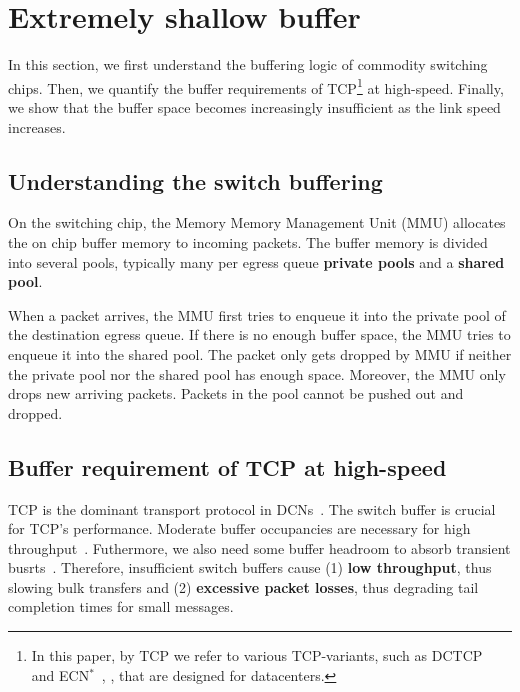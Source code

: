 \section{Extremely shallow buffer}\label{sec:background}
In this section, we first understand the buffering logic of commodity switching chips. Then, we quantify the buffer requirements of TCP\footnote{In this paper, by TCP we refer to various TCP-variants, such as DCTCP~\cite{dctcp} and ECN$^{*}$~\cite{tuning}, \etc, that are designed for datacenters.} at high-speed. Finally, we show that the buffer space becomes increasingly insufficient as the link speed increases.

\subsection{Understanding the switch buffering}
On the switching chip, the Memory Memory Management Unit (MMU) allocates the on chip buffer memory to incoming packets. The buffer memory is divided into several pools, typically many per egress queue \textbf{private pools} and a \textbf{shared pool}.


When a packet arrives, the MMU first tries to enqueue it into the private pool of the destination egress queue. If there is no enough buffer space, the MMU tries to enqueue it into the shared pool. The packet only gets dropped by MMU if neither the private pool nor the shared pool has enough space. Moreover, the MMU only drops new arriving packets. Packets in the pool cannot be pushed out and dropped.

\subsection{Buffer requirement of TCP at high-speed}\label{subsec:buffer_requirement_high_speed}
TCP is the dominant transport protocol in DCNs~\cite{dctcp}. The switch buffer is crucial for TCP's performance. Moderate buffer occupancies are necessary for high throughput~\cite{sizing}. Futhermore, we also need some buffer headroom to absorb transient busrts~\cite{dctcp}. Therefore, insufficient switch buffers cause (1) \textbf{low throughput}, thus slowing bulk transfers and (2) \textbf{excessive packet losses}, thus degrading tail completion times for small messages.

